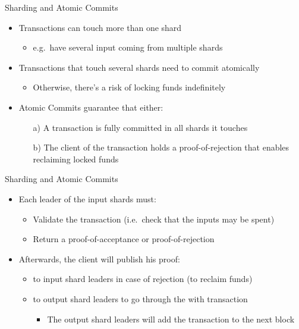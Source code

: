 \begin{frame}{Sharding and Atomic Commits}
		\begin{itemize}
			\item Transactions can touch more than one shard
			\begin{itemize}
				\item e.g.\ have several input coming from multiple shards
			\end{itemize}
			\item Transactions that touch several shards need to commit atomically
			\begin{itemize}
				\item Otherwise, there's a risk of locking funds indefinitely
			\end{itemize}
			\item Atomic Commits guarantee that either:
			\begin{itemize}
				\item[a)] A transaction is fully committed in all shards it touches
				\item[b)] The client of the transaction holds a proof-of-rejection that enables reclaiming locked funds
			\end{itemize}
		\end{itemize}
	\end{frame}
	\note{
		\begin{itemize}
			\item 
		\end{itemize}
	}	
	
\begin{frame}{Sharding and Atomic Commits}
		\begin{itemize}
			
			\item Each leader of the input shards must:
			\begin{itemize}
				\item Validate the transaction (i.e.\ check that the inputs may be spent)
				\item Return a \alert{proof-of-acceptance} or \alert{proof-of-rejection}
			\end{itemize}
			\item Afterwards, the client will publish his proof:
			\begin{itemize}
				\item to input shard leaders in case of rejection (to reclaim funds)
				\item to output shard leaders to go through the with transaction
				\begin{itemize}
					\item The output shard leaders will add the transaction to the next block
				\end{itemize}
			\end{itemize}
		\end{itemize}
	\end{frame}
		
